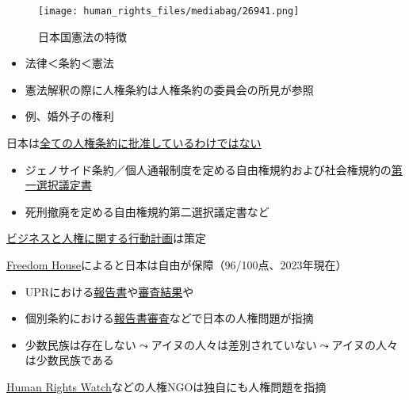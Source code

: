 \documentclass[
  xelatex,
  ja=standard]{bxjsarticle}
\providecommand{\tightlist}{%
  \setlength{\itemsep}{0pt}\setlength{\parskip}{0pt}}\usepackage{longtable,booktabs,array}
\begin{document}
\begin{figure}[htpb]

{\centering \texttt{[image: human\_rights\_files/mediabag/26941.png]}

}

\caption{日本国憲法の特徴}

\end{figure}

\begin{itemize}
\tightlist
\item
  法律＜条約＜憲法
\item
  憲法解釈の際に人権条約は人権条約の委員会の所見が参照
\item
  例、婚外子の権利
\end{itemize}

日本は\href{https://www.hurights.or.jp/archives/treaty/un-treaty-list.html}{全ての人権条約に批准しているわけではない}

\begin{itemize}
\tightlist
\item
  ジェノサイド条約／個人通報制度を定める自由権規約および社会権規約の\href{https://www.nichibenren.or.jp/activity/international/library/human_rights/liberty_protocols_no1.html}{第一選択議定書}
\item
  死刑撤廃を定める自由権規約第二選択議定書など
\end{itemize}

\href{https://www.mofa.go.jp/mofaj/gaiko/bhr/index.html}{ビジネスと人権に関する行動計画}は策定

\href{https://freedomhouse.org/country/japan/freedom-world/2023}{Freedom
House}によると日本は自由が保障（96/100点、2023年現在）

\begin{itemize}
\tightlist
\item
  UPRにおける\href{https://www.nichibenren.or.jp/activity/international/library/upr.html}{報告書}や\href{https://www.mofa.go.jp/mofaj/gaiko/jinken_r/upr_gai.html}{審査結果}や
\item
  個別条約における\href{https://www.nichibenren.or.jp/activity/international/library/human_rights.html}{報告書審査}などで日本の人権問題が指摘
\item
  少数民族は存在しない\(\leadsto\)アイヌの人々は差別されていない\(\leadsto\)アイヌの人々は少数民族である
\end{itemize}

\href{https://www.hrw.org/ja/asia/japan}{Human Rights
Watch}などの人権NGOは独自にも人権問題を指摘
\end{document}
